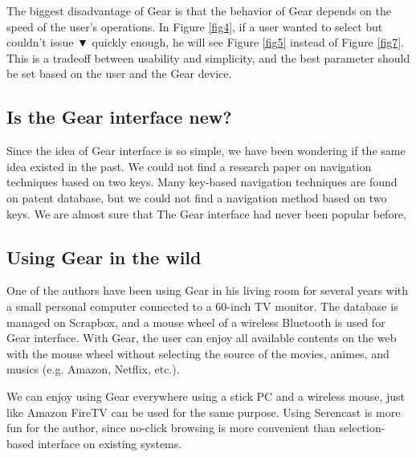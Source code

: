 \documentclass[conference]{IEEEtran}
\def\down{▼}
\def\SC{Serencast}
\def\SB{Scrapbox}
\begin{document}
The biggest disadvantage of Gear is that
the behavior of Gear depends on the speed of the user's operations.
In Figure \ref{fig4},
if a user wanted to select  but couldn't issue {\down}
quickly enough, he will see Figure \ref{fig5} instead of Figure \ref{fig7}.
This is a tradeoff between usability and simplicity, and
the best parameter should be set based on the user and the Gear device.

\subsection{Is the Gear interface new?}

Since the idea of Gear interface is so simple,
we have been wondering if the same idea existed in the past.
%
We could not find a research paper on 
navigation techniques based on two keys.
Many key-based navigation techniques are found on patent database,
but we could not find a navigation method based on two keys.
We are almost sure that The Gear interface had never been popular before,

\subsection{Using Gear in the wild}

One of the authors have been using Gear in his living room for several years
with a small personal computer connected to a 60-inch TV monitor.
The database is managed on {\SB}, and
a mouse wheel of a wireless Bluetooth is used for Gear interface.
With Gear, the user can enjoy all available contents on the web with the mouse wheel
without selecting the source of the movies, animes, and musics (e.g. Amazon, Netflix, etc.).

We can enjoy using Gear everywhere using a stick PC and a wireless mouse,
just like Amazon FireTV can be used for the same purpose.
Using {\SC} is more fun for the author, since no-click browsing is more convenient than
selection-based interface on existing systems.

\end{document}
